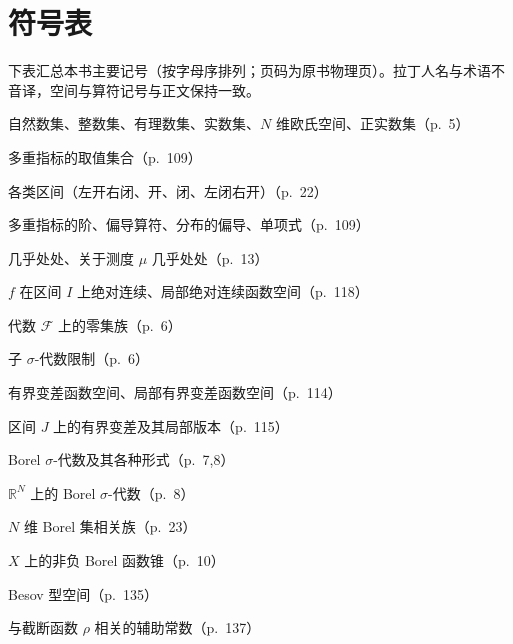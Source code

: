 \documentclass[../main.tex]{subfiles}
\begin{document}
\chapter*{符号表}\label{chapter:symbols}

下表汇总本书主要记号（按字母序排列；页码为原书物理页）。拉丁人名与术语不音译，空间与算符记号与正文保持一致。

\begin{description}[style=nextline,leftmargin=1.2em,itemsep=1pt,topsep=2pt,font=\normalfont\small]
\item[{$\mathbb{N},\mathbb{Z},\mathbb{Q},\mathbb{R},\mathbb{R}^N,\mathbb{R}_+$}] 自然数集、整数集、有理数集、实数集、$N$ 维欧氏空间、正实数集（p.~5）
\item[{$\mathbb{N}$}] 多重指标的取值集合（p.~109）
\item[{$(a,b],(a,b),[a,b],[a,b)$}] 各类区间（左开右闭、开、闭、左闭右开）（p.~22）
\item[{$|\alpha|,\ D^\alpha,\ D_T^\alpha,\ x^\alpha$，$\alpha\equiv(\alpha_1,\cdots ,\alpha_N)$}] 多重指标的阶、偏导算符、分布的偏导、单项式（p.~109）
\item[{$\mathrm{a.\,e.},\ \mu\text{-}\mathrm{a.\,e.}$}] 几乎处处、关于测度 $\mu$ 几乎处处（p.~13）
\item[{$f\in AC(I),\ AC_{\mathrm{loc}}(U)$}] $f$ 在区间 $I$ 上绝对连续、局部绝对连续函数空间（p.~118）
\item[{$\mathcal{A}_0(\mathcal{F})$}] 代数 $\mathcal{F}$ 上的零集族（p.~6）
\item[{$\mathcal{A}\cap\mathcal{F}$}] 子 $\sigma$-代数限制（p.~6）
\item[{$BV(U),\ BV_{\mathrm{loc}}(U)$}] 有界变差函数空间、局部有界变差函数空间（p.~114）
\item[{$BV^J(U),\ BV^J_{\mathrm{loc}}(U)$}] 区间 $J$ 上的有界变差及其局部版本（p.~115）
\item[{$\mathcal{B},\ \mathcal{B}(X),\ \mathcal{B}(X,\mathcal{T}),\ \mathcal{B}_a(X)$}] Borel $\sigma$-代数及其各种形式（p.~7,8）
\item[{$\mathcal{B}(\mathbb{R}^N)$}] $\mathbb{R}^N$ 上的 Borel $\sigma$-代数（p.~8）
\item[{$\mathcal{B}_N$}] $N$ 维 Borel 集相关族（p.~23）
\item[{$\mathcal{B}_+(X)$}] $X$ 上的非负 Borel 函数锥（p.~10）
\item[{$B_{r,p}(E)$}] Besov 型空间（p.~135）
\item[{$\beta_\rho$}] 与截断函数 $\rho$ 相关的辅助常数（p.~137）

\end{description}
\end{document}
